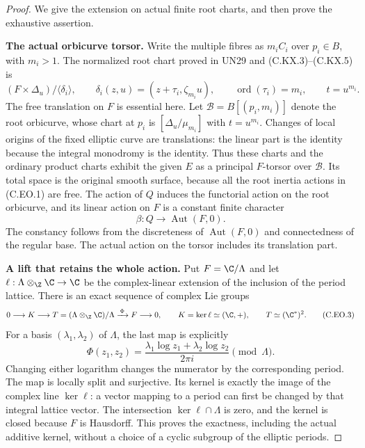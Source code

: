 \begin{proof}
We give the extension on actual finite root charts,
and then prove the exhaustive assertion.

\par\medskip\noindent\textbf{The actual orbicurve torsor.}
Write the multiple fibres as $m_iC_i$ over $p_i\in B$,
with $m_i>1$. The normalized root chart proved in
UN29 and (C.KX.3)--(C.KX.5) is
\[
 (F\times\Delta_u)/\langle\delta_i\rangle,
 \qquad
 \delta_i(z,u)=(z+\tau_i,\zeta_{m_i}u),
 \qquad \operatorname{ord}(\tau_i)=m_i,
 \qquad t=u^{m_i}.
                                                               \tag{C.EO.1}
\]
The free translation on $F$ is essential here.
Let $\mathcal B=B[(p_i,m_i)]$ denote the root
orbicurve, whose chart at $p_i$ is
$[\Delta_u/\mu_{m_i}]$ with $t=u^{m_i}$.
Changes of local origins of the fixed elliptic
curve are translations: the linear part is the
identity because the integral monodromy is the
identity. Thus these charts and the ordinary
product charts exhibit the given $E$ as a
principal $F$-torsor over $\mathcal B$.
Its total space is the original smooth surface,
because all the root inertia actions in (C.EO.1)
are free. The action of $Q$ induces the functorial
action on the root orbicurve, and its linear action
on $F$ is a constant finite character
\[
                 \beta:Q\longrightarrow
                            \operatorname{Aut}(F,0).
                                                               \tag{C.EO.2}
\]
The constancy follows from the discreteness of
$\operatorname{Aut}(F,0)$ and connectedness of
the regular base. The actual action on the
torsor includes its translation part.

\par\medskip\noindent\textbf{A lift that retains the whole action.}
Put $F=\C/\Lambda$ and let
$\ell:\Lambda\otimes_{\Z}\C\to\C$
be the complex-linear extension of the inclusion
of the period lattice. There is an exact sequence
of complex Lie groups
\[
 0\longrightarrow K\longrightarrow
 T=(\Lambda\otimes_{\Z}\C)/\Lambda
 \xrightarrow{\,\Phi\,}F\longrightarrow0,
 \qquad K=\ker\ell\simeq(\C,+),
 \qquad T\simeq(\C^*)^2.                              \tag{C.EO.3}
\]
For a basis $(\lambda_1,\lambda_2)$ of $\Lambda$,
the last map is explicitly
\[
 \Phi(z_1,z_2)=
 \frac{\lambda_1\log z_1+\lambda_2\log z_2}{2\pi i}
                    \pmod\Lambda .                 \tag{C.EO.4}
\]
Changing either logarithm changes the numerator
by the corresponding period. The map is locally
split and surjective. Its kernel is exactly
the image of the complex line $\ker\ell$:
a vector mapping to a period can first be
changed by that integral lattice vector.
The intersection $\ker\ell\cap\Lambda$ is zero,
and the kernel is closed because $F$ is Hausdorff.
This proves the exactness, including the actual
additive kernel, without a choice of a cyclic
subgroup of the elliptic periods.


\end{proof}
